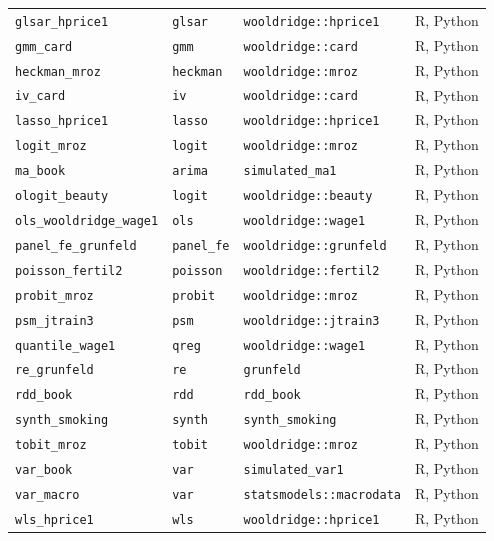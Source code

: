 {\begin{longtable}{llll}
\texttt{glsar\_hprice1} & \texttt{glsar} & \texttt{wooldridge::hprice1} & R, Python \\
\texttt{gmm\_card} & \texttt{gmm} & \texttt{wooldridge::card} & R, Python \\
\texttt{heckman\_mroz} & \texttt{heckman} & \texttt{wooldridge::mroz} & R, Python \\
\texttt{iv\_card} & \texttt{iv} & \texttt{wooldridge::card} & R, Python \\
\texttt{lasso\_hprice1} & \texttt{lasso} & \texttt{wooldridge::hprice1} & R, Python \\
\texttt{logit\_mroz} & \texttt{logit} & \texttt{wooldridge::mroz} & R, Python \\
\texttt{ma\_book} & \texttt{arima} & \texttt{simulated\_ma1} & R, Python \\
\texttt{ologit\_beauty} & \texttt{logit} & \texttt{wooldridge::beauty} & R, Python \\
\texttt{ols\_wooldridge\_wage1} & \texttt{ols} & \texttt{wooldridge::wage1} & R, Python \\
\texttt{panel\_fe\_grunfeld} & \texttt{panel\_fe} & \texttt{wooldridge::grunfeld} & R, Python \\
\texttt{poisson\_fertil2} & \texttt{poisson} & \texttt{wooldridge::fertil2} & R, Python \\
\texttt{probit\_mroz} & \texttt{probit} & \texttt{wooldridge::mroz} & R, Python \\
\texttt{psm\_jtrain3} & \texttt{psm} & \texttt{wooldridge::jtrain3} & R, Python \\
\texttt{quantile\_wage1} & \texttt{qreg} & \texttt{wooldridge::wage1} & R, Python \\
\texttt{re\_grunfeld} & \texttt{re} & \texttt{grunfeld} & R, Python \\
\texttt{rdd\_book} & \texttt{rdd} & \texttt{rdd\_book} & R, Python \\
\texttt{synth\_smoking} & \texttt{synth} & \texttt{synth\_smoking} & R, Python \\
\texttt{tobit\_mroz} & \texttt{tobit} & \texttt{wooldridge::mroz} & R, Python \\
\texttt{var\_book} & \texttt{var} & \texttt{simulated\_var1} & R, Python \\
\texttt{var\_macro} & \texttt{var} & \texttt{statsmodels::macrodata} & R, Python \\
\texttt{wls\_hprice1} & \texttt{wls} & \texttt{wooldridge::hprice1} & R, Python \\
\end{longtable}}
